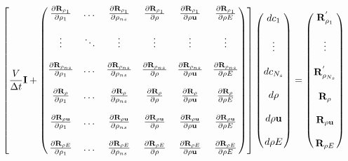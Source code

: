 \begin{equation}
  \left[ 
    \frac{V}{\Delta t} \mi + 
    \begin{pmatrix}
      \tdiff{\rho_1}{\rho_1}    & \dots  & \tdiff{\rho_{ns}}{\rho_1}    & \tdiff{\rho}{\rho_1}    & \tdiff{\rho \vu}{\rho_1}    & \tdiff{\rho E}{\rho_1} \\ \\
      \vdots                    & \ddots & \vdots                       & \vdots                  & \vdots                      & \vdots                   \\ \\
      \tdiff{\rho_1}{\rho_{ns}} & \dots  & \tdiff{\rho_{ns}}{\rho_{ns}} & \tdiff{\rho}{\rho_{ns}} & \tdiff{\rho \vu}{\rho_{ns}} & \tdiff{\rho E}{\rho_{ns}} \\ \\
      \tdiff{\rho_1}{\rho}      & \dots  & \tdiff{\rho_{ns}}{\rho}      & \tdiff{\rho}{\rho}      & \tdiff{\rho \vu}{\rho}      & \tdiff{\rho E}{\rho}      \\ \\
      \tdiff{\rho_1}{\rho \vu}  & \dots  & \tdiff{\rho_{ns}}{\rho \vu}  & \tdiff{\rho}{\rho \vu}  & \tdiff{\rho \vu}{\rho \vu}  & \tdiff{\rho E}{\rho \vu} \\ \\
      \tdiff{\rho_1}{\rho E}    & \dots  & \tdiff{\rho_{ns}}{\rho E}    & \tdiff{\rho}{\rho E}    & \tdiff{\rho \vu}{\rho E}    & \tdiff{\rho E}{\rho E}
    \end{pmatrix}
  \right]
  \begin{pmatrix}
    d c_1      \\ \\
    \vdots     \\ \\
    d c_{N_s}  \\ \\
    d \rho     \\ \\
    d \rho \vu \\ \\
    d \rho E
  \end{pmatrix}
  =
  \begin{pmatrix}
    \res{\rho_1}^{'}     \\ \\
    \vdots               \\ \\
    \res{\rho_{N_s}}^{'} \\ \\
    \res{\rho}           \\ \\
    \res{\rho \vu}       \\ \\
    \res{\rho E}
  \end{pmatrix}
  \label{dc-flow}
\end{equation}
